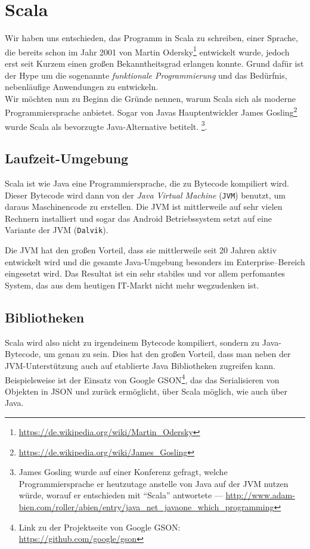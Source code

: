\chapter{Scala}
Wir haben uns entschieden, das Programm in Scala zu schreiben, einer Sprache, die bereits schon im Jahr 2001 von Martin Odersky\footnote{\url{https://de.wikipedia.org/wiki/Martin_Odersky}} entwickelt wurde, jedoch erst seit Kurzem einen großen Bekanntheitsgrad erlangen konnte. Grund dafür ist der Hype um die sogenannte \textit{funktionale Programmierung} und das Bedürfnis, nebenläufige Anwendungen zu entwickeln.\\
Wir möchten nun zu Beginn die Gründe nennen, warum Scala sich als moderne Programmiersprache anbietet. Sogar von Javas Hauptentwickler James Gosling\footnote{\url{https://de.wikipedia.org/wiki/James_Gosling}} wurde Scala als bevorzugte Java-Alternative betitelt. \footnote{James Gosling wurde auf einer Konferenz gefragt, welche Programmiersprache er heutzutage anstelle von Java auf der JVM nutzen würde, worauf er entschieden mit ``Scala'' antwortete --- \url{http://www.adam-bien.com/roller/abien/entry/java_net_javaone_which_programming}}.

\section{Laufzeit-Umgebung}
Scala ist wie Java eine Programmiersprache, die zu Bytecode kompiliert wird. Dieser Bytecode wird dann von der \textit{Java Virtual Machine} (\texttt{JVM}) benutzt, um daraus Maschinencode zu erstellen. Die JVM ist mittlerweile auf sehr vielen Rechnern installiert und sogar das Android Betriebssystem setzt auf eine Variante der JVM (\texttt{Dalvik}).

Die JVM hat den großen Vorteil, dass sie mittlerweile seit 20 Jahren aktiv entwickelt wird und die gesamte Java-Umgebung besonders im Enterprise--Bereich eingesetzt wird. Das Resultat ist ein sehr stabiles und vor allem perfomantes System, das aus dem heutigen IT-Markt nicht mehr wegzudenken ist.

\section{Bibliotheken}
Scala wird also nicht zu irgendeinem Bytecode kompiliert, sondern zu Java-Bytecode, um genau zu sein. Dies hat den großen Vorteil, dass man neben der JVM-Unterstützung auch auf etablierte Java Bibliotheken zugreifen kann. Beispielsweise ist der Einsatz von Google GSON\footnote{Link zu der Projektseite von Google GSON: \url{https://github.com/google/gson}}, das das Serialisieren von Objekten in JSON und zurück ermöglicht, über Scala möglich, wie auch über Java.

